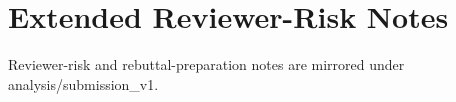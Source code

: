 \section{Extended Reviewer-Risk Notes}
Reviewer-risk and rebuttal-preparation notes are mirrored under analysis/submission_v1.
